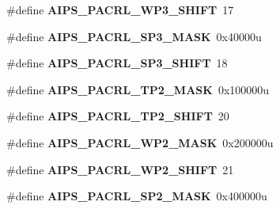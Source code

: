 \begin{DoxyCompactItemize}
\item 
\#define {\bfseries A\+I\+P\+S\+\_\+\+P\+A\+C\+R\+L\+\_\+\+W\+P3\+\_\+\+S\+H\+I\+FT}~17\hypertarget{group__AIPS__Register__Masks_ga8ec2e1684d29716b333031ebdeb86ae2}{}\label{group__AIPS__Register__Masks_ga8ec2e1684d29716b333031ebdeb86ae2}

\item 
\#define {\bfseries A\+I\+P\+S\+\_\+\+P\+A\+C\+R\+L\+\_\+\+S\+P3\+\_\+\+M\+A\+SK}~0x40000u\hypertarget{group__AIPS__Register__Masks_gabb829ec4870ac8a99ab6e3f683b6f56f}{}\label{group__AIPS__Register__Masks_gabb829ec4870ac8a99ab6e3f683b6f56f}

\item 
\#define {\bfseries A\+I\+P\+S\+\_\+\+P\+A\+C\+R\+L\+\_\+\+S\+P3\+\_\+\+S\+H\+I\+FT}~18\hypertarget{group__AIPS__Register__Masks_gabc1674c43d6856eb907733c29e99afac}{}\label{group__AIPS__Register__Masks_gabc1674c43d6856eb907733c29e99afac}

\item 
\#define {\bfseries A\+I\+P\+S\+\_\+\+P\+A\+C\+R\+L\+\_\+\+T\+P2\+\_\+\+M\+A\+SK}~0x100000u\hypertarget{group__AIPS__Register__Masks_ga6d4d737074b8d13902a1ab378abcf333}{}\label{group__AIPS__Register__Masks_ga6d4d737074b8d13902a1ab378abcf333}

\item 
\#define {\bfseries A\+I\+P\+S\+\_\+\+P\+A\+C\+R\+L\+\_\+\+T\+P2\+\_\+\+S\+H\+I\+FT}~20\hypertarget{group__AIPS__Register__Masks_ga0e7564f6e9b319f465b33bb9ae7a7039}{}\label{group__AIPS__Register__Masks_ga0e7564f6e9b319f465b33bb9ae7a7039}

\item 
\#define {\bfseries A\+I\+P\+S\+\_\+\+P\+A\+C\+R\+L\+\_\+\+W\+P2\+\_\+\+M\+A\+SK}~0x200000u\hypertarget{group__AIPS__Register__Masks_gab01249dcc888add36ffb568f86b6e749}{}\label{group__AIPS__Register__Masks_gab01249dcc888add36ffb568f86b6e749}

\item 
\#define {\bfseries A\+I\+P\+S\+\_\+\+P\+A\+C\+R\+L\+\_\+\+W\+P2\+\_\+\+S\+H\+I\+FT}~21\hypertarget{group__AIPS__Register__Masks_ga622a1ec673e76d5e59a9011abfd02b9d}{}\label{group__AIPS__Register__Masks_ga622a1ec673e76d5e59a9011abfd02b9d}

\item 
\#define {\bfseries A\+I\+P\+S\+\_\+\+P\+A\+C\+R\+L\+\_\+\+S\+P2\+\_\+\+M\+A\+SK}~0x400000u\hypertarget{group__AIPS__Register__Masks_gab8610002128f107ec5adcab92fc9f31f}{}\label{group__AIPS__Register__Masks_gab8610002128f107ec5adcab92fc9f31f}


\end{DoxyCompactItemize}
